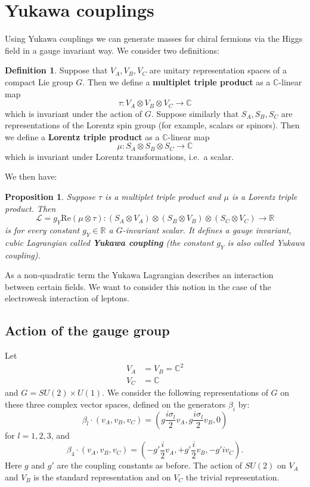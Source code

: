 \documentclass[12pt]{amsart}
\newtheorem{prop}[thm]{Proposition}
\theoremstyle{definition}
\newtheorem{defn}[thm]{Definition}
\theoremstyle{remark}
\numberwithin{equation}{section}
\begin{document}
\section{Yukawa couplings}\label{sect Yukawa}
Using Yukawa couplings we can generate masses for chiral fermions via the Higgs field in a gauge invariant way. We consider two definitions:
\begin{defn}
Suppose that $V_A,V_B,V_C$ are unitary representation spaces of a compact Lie group $G$. Then we define a {\bf multiplet triple product} as a $\mathbb{C}$-linear map
\begin{equation*}
\tau\colon V_A\otimes V_B\otimes V_C\longrightarrow\mathbb{C}
\end{equation*}
which is invariant under the action of $G$. Suppose similarly that $S_A,S_B,S_C$ are representations of the Lorentz spin group (for example, scalars or spinors). Then we define a {\bf Lorentz triple product} as a $\mathbb{C}$-linear map
\begin{equation*}
\mu\colon S_A\otimes S_B\otimes S_C\longrightarrow\mathbb{C}
\end{equation*}
which is invariant under Lorentz transformations, i.e.~a scalar.
\end{defn}
We then have:
\begin{prop}\label{prop yukawa coupling}Suppose $\tau$ is a multiplet triple product and $\mu$ is a Lorentz triple product. Then
\begin{equation*}
\mathcal{L}=g_Y\mathrm{Re}(\mu\otimes\tau)\colon (S_A\otimes V_A)\otimes (S_B\otimes V_B)\otimes (S_C\otimes V_C)\longrightarrow\mathbb{R}
\end{equation*}
is for every constant $g_Y\in\mathbb{R}$ a $G$-invariant scalar. It defines a gauge invariant, cubic Lagrangian called {\bf Yukawa coupling} (the constant $g_Y$ is also called Yukawa coupling). 
\end{prop}
As a non-quadratic term the Yukawa Lagrangian describes an interaction between certain fields. We want to consider this notion in the case of the electroweak interaction of leptons.
\subsection{Action of the gauge group}
Let 
\begin{align*}
V_A&=V_B=\mathbb{C}^2\\
V_C&=\mathbb{C}
\end{align*}
and $G=SU(2)\times U(1)$. We consider the following representations of $G$ on these three complex vector spaces, defined on the generators $\beta_i$ by:
\begin{equation*}
\beta_l\cdot (v_A,v_B,v_C)=\left(g\frac{i\sigma_l}{2}v_A,g\frac{i\sigma_l}{2}v_B,0\right)
\end{equation*}
for $l=1,2,3$, and
\begin{equation*}
\beta_4\cdot (v_A,v_B,v_C)=\left(-g'\frac{i}{2}v_A, +g'\frac{i}{2}v_B, -g'iv_C\right).
\end{equation*}
Here $g$ and $g'$ are the coupling constants as before. The action of $SU(2)$ on $V_A$ and $V_B$ is the standard representation and on $V_C$ the trivial representation. 
\end{document}
